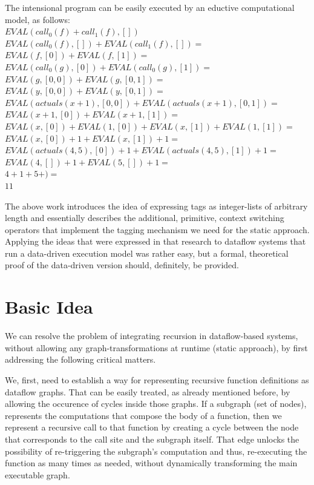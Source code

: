 \documentclass[ack,preface]{dithesis}
\begin{document}
\begin{flushleft}
The intensional program can be easily executed by an eductive computational model, as follows:\\
 \setlength{\parindent}{15ex} $EVAL(call_0(f)+call_1(f), [])$ \\
$EVAL(call_0(f), []) + EVAL(call_1(f), []) =$ \\ 
$EVAL(f, [0]) + EVAL(f, [1]) =$ \\ 
$EVAL(call_0(g), [0]) + EVAL(call_0(g), [1]) =$ \\ 
$EVAL(g, [0,0]) + EVAL(g, [0,1]) =$ \\ 
$EVAL(y, [0,0]) + EVAL(y, [0,1]) =$ \\ 
$EVAL(actuals(x+1), [0,0]) + EVAL(actuals(x+1), [0,1]) =$ \\ 
$EVAL(x+1, [0]) + EVAL(x+1, [1]) =$ \\ 
$EVAL(x, [0]) + EVAL(1, [0]) + EVAL(x, [1]) + EVAL(1, [1]) =$ \\ 
$EVAL(x, [0]) + 1 + EVAL(x, [1]) + 1 =$ \\
$EVAL(actuals(4,5), [0]) + 1 + EVAL(actuals(4,5), [1]) + 1 =$ \\
$EVAL(4, []) + 1 + EVAL(5, []) + 1 =$ \\
$4+1+5+ ) =$ \\
$11$ \\
\end{flushleft}


The above work introduces the idea of expressing tags as integer-lists of arbitrary length and essentially describes the additional, primitive, context switching operators that implement the tagging mechanism we need for the static approach. Applying the ideas that were expressed in that research to dataflow systems that run a data-driven execution model was rather easy, but a formal, theoretical proof of the data-driven version should, definitely, be provided.

    \section{Basic Idea}
We can resolve the problem of integrating recursion in dataflow-based systems, without allowing any graph-transformations at runtime (static approach), by first addressing the following critical matters.

We, first, need to establish a way for representing recursive function definitions as dataflow graphs.  That can be easily treated, as already mentioned before, by allowing the occurence of cycles inside those graphs. If a subgraph (set of nodes), represents the computations that compose the body of a function, then we represent a recursive call to that function by creating a cycle between the node that corresponds to the call site and the subgraph itself. That edge unlocks the possibility of  re-triggering the subgraph's computation and thus, re-executing the function as many times as needed, without dynamically transforming the main executable graph.
\end{document}
